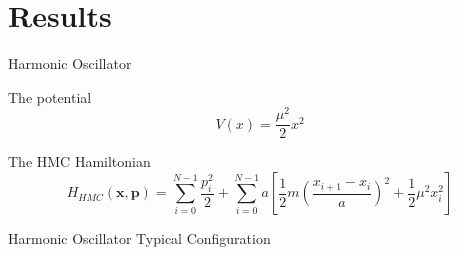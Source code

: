 \documentclass{beamer}
\begin{document}
\section{Results}
    \begin{frame}{Harmonic Oscillator}
        {
        \begin{block}{The potential}
            \begin{equation*}
            V\left(x\right) = \frac{\mu^2}{2}x^2
            \end{equation*}
        \end{block}
        }
        {
        \begin{block}{The HMC Hamiltonian}
            \begin{equation*}
            H_{HMC}\left(\bm{x},\bm{p}\right) = \sum_{i=0}^{N-1} \frac{p_i^2}{2} + \sum_{i=0}^{N-1} a \left[\frac{1}{2}m\left(\frac{x_{i+1}-x_{i}}{a}\right)^2 + \frac{1}{2}\mu^2x_i^2\right]
            \end{equation*}
        \end{block}
        }
    \end{frame}
    
    \begin{frame}{Harmonic Oscillator Typical Configuration}
        {
            \begin{figure}
                    \centering
                        \label{fig:TypicalHarmonicPath}
                \end{figure}
        }
    \end{frame}
\end{document}
